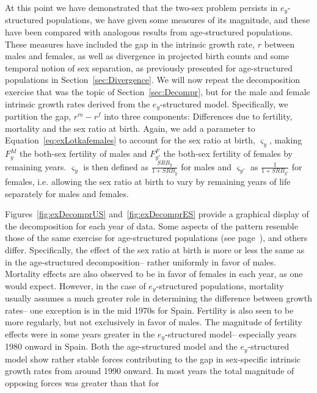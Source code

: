  \FloatBarrier
 \label{sec:exdecomposer}
At this point we have demonstrated that the two-sex problem persists in
$e_y$-structured populations, we have given some measures of its
magnitude, and these have been compared with analogous results from
age-structured populations. These measures have included the gap in the
intrinsic growth rate, $r$ between males and females, as well as
divergence in projected birth counts and some
temporal notion of sex separation, as previously
presented for age-structured populations in Section~\ref{sec:Divergence}. We
will now repeat the decomposition exercise that was the topic of
 Section~\ref{sec:Decompr}, but for the male and female intrinsic growth rates 
 derived from the $e_y$-structured model. Specifically, we partition the 
 gap, $r^m-r^f$ into three components: Differences due to fertility, 
 mortality and the sex
ratio at birth. Again, we add a parameter to Equation~\eqref{eq:exLotkafemales}
to account for the sex ratio at birth, $\varsigma _{y}$, making $F_{y}^M$
the both-sex fertility of males and $F_{y'}^F$ the both-sex fertility of females
by remaining years. $\varsigma _{y}$ is then defined as $\frac{SRB_y}{1+SRB_y}$
for males and $\varsigma _{y'}$ as $\frac{1}{1+SRB_{y'}}$ for females, i.e.
allowing the sex ratio at birth to vary by remaining years of life separately 
for males and females.

Figures~\ref{fig:exDecomprUS} and~\ref{fig:exDecomprES} provide a graphical
display of the decomposition for each year of data. Some
aspects of the pattern resemble those of the same exercise for age-structured 
populations (see page~\pageref{fig:DecomprUS}), and others differ.
Specifically, the effect of the sex ratio at birth is more or less the same as
in the age-structured decomposition-- rather uniformly in favor of males.
Mortality effects are also observed to be in favor of females in each year, as
one would expect. However, in the case of $e_y$-structured populations,
mortality usually assumes a much greater role in determining the difference between growth
rates-- one exception is in the mid 1970s for Spain. Fertility is also seen to
be more regularly, but not exclusively in favor of males. The magnitude of
fertility effects were in some years greater in the $e_y$-structured model--
especially years 1980 onward in Spain. Both the age-structured model and the
$e_y$-structured model show rather stable forces contributing to the gap in
sex-specific intrinsic growth rates from around 1990 onward. In most years the
total magnitude of opposing forces was greater than that for


